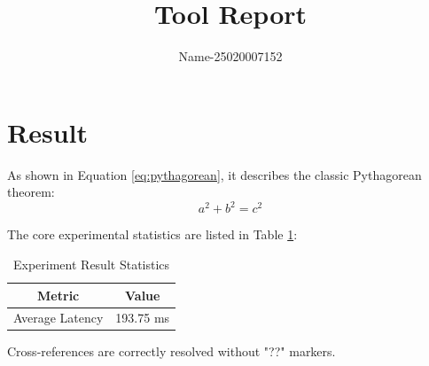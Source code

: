 \documentclass{article}
\begin{document}
\title{Tool Report}
\author{Name-25020007152}
\maketitle

\section{Result}

As shown in Equation \eqref{eq:pythagorean}, it describes the classic Pythagorean theorem:
\begin{equation}
    a^2 + b^2 = c^2
    \label{eq:pythagorean}
\end{equation}

The core experimental statistics are listed in Table \ref{tab:result}:
\begin{table}[htbp]
    \centering
    \caption{Experiment Result Statistics}
    \label{tab:result}
    \begin{tabular}{|c|c|}
        \hline
        Metric & Value \\
        \hline
        Average Latency & 193.75 ms \\
        \hline
    \end{tabular}
\end{table}

Cross-references are correctly resolved without "??" markers.
\end{document}
